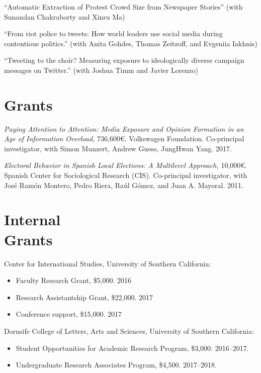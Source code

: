 \documentclass[margin,line,11pt]{resume}
\begin{document}
\begin{resume}
``Automatic Extraction of Protest Crowd Size from Newspaper Stories'' (with Sunandan Chakraborty and Xinru Ma)

``From riot police to tweets: How world leaders use social media during contentious politics.'' (with Anita Gohdes, Thomas Zeitzoff, and Evgeniia Iakhnis)

``Tweeting to the choir? Measuring exposure to ideologically diverse campaign messages on Twitter.'' (with Joshua Timm and Javier Lorenzo)




        \section{\mysidestyle Grants}
\textit{Paying Attention to Attention: Media Exposure and Opinion Formation in an Age of Information Overload,} 736,600\euro. Volkswagen Foundation. Co-principal investigator, with Simon Munzert, Andrew Guess, JungHwan Yang. 2017.

    \textit{Electoral Behavior in Spanish Local Elections: A Multilevel Approach,} 10,000\euro. Spanish Center for Sociological Research (CIS). Co-principal investigator, with Jos\'{e} Ram\'{o}n Montero, Pedro Riera, Ra\'{u}l G\'{o}mez, and Juan A. Mayoral. 2011.    

  

        \section{\mysidestyle Internal\\Grants}

Center for International Studies, University of Southern California:
\begin{itemize}
\item[] Faculty Research Grant, \$5,000. 2016
\vspace{-.15cm}
\item[] Research Assistantship Grant, \$22,000. 2017
\vspace{-.15cm}
\item[] Conference support, \$15,000. 2017
\end{itemize}
Dornsife College of Letters, Arts and Sciences, University of Southern California:
\begin{itemize}
\item[] Student Opportunities for Academic Research Program, \$3,000. 2016--2017.
\vspace{-.15cm}
\item[] Undergraduate Research Associates Program, \$4,500. 2017--2018.
\end{itemize}
 

\end{resume}
\end{document}
